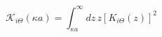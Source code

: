 \begin{equation}
{\mathcal K_{i \Theta}} (\kappa a)
 = 
\int_{\kappa a}^{\infty} 
d z \, z
 \left[ K_{i \Theta} (z) \right]^{2} 
\; 
\label{eq:mathcal_K_integral_def}
\end{equation}

